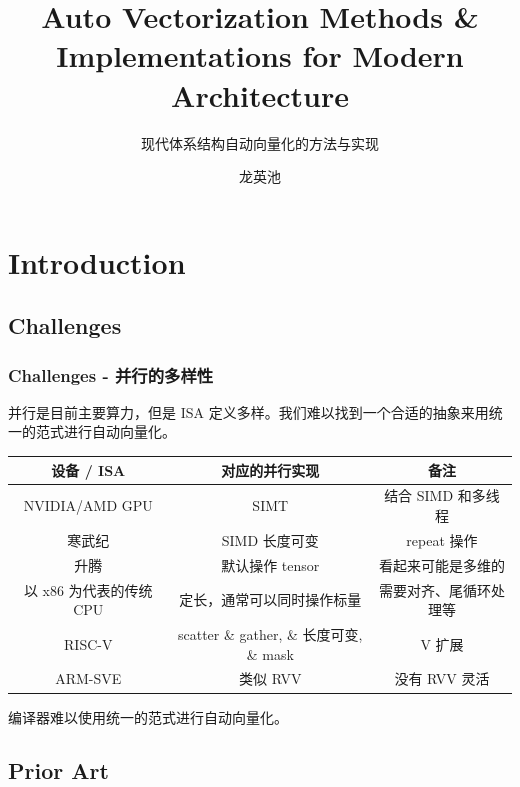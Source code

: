\documentclass[aspectratio=169]{ctexbeamer}
\title{Auto Vectorization Methods \& Implementations for Modern Architecture}
\subtitle{现代体系结构自动向量化的方法与实现}
\author{龙英池}
\institute{Interns @ ISCAS}
\begin{document}
\maketitle
\section{Introduction}
\subsection{Challenges}
\begin{frame}
    \frametitle{Challenges - 并行的多样性}

    并行是目前主要算力，但是 ISA 定义多样。我们难以找到一个合适的抽象来用统一的范式进行自动向量化。

    \begin{table}
        \centering
        \begin{tabular}{ccc}
            \toprule
            设备 / ISA         & 对应的并行实现                             & 备注           \\
            \midrule
            NVIDIA/AMD GPU   & SIMT                                & 结合 SIMD 和多线程 \\
            寒武纪              & SIMD 长度可变                           & repeat 操作    \\
            升腾               & 默认操作 tensor                         & 看起来可能是多维的    \\
            以 x86 为代表的传统 CPU & 定长，通常可以同时操作标量                       & 需要对齐、尾循环处理等  \\
            RISC-V           & scatter \& gather, \& 长度可变, \& mask & V 扩展         \\
            ARM-SVE          & 类似 RVV                              & 没有 RVV 灵活    \\
            \bottomrule
        \end{tabular}
    \end{table}

    编译器难以使用统一的范式进行自动向量化。

\end{frame}

\subsection{Prior Art}
\end{document}
